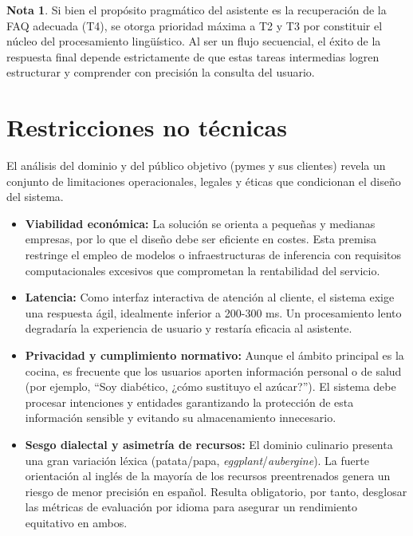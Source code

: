 \documentclass[11pt,a4paper,twoside]{article}
\theoremstyle{definition}
\newtheorem{nota}{Nota}
\numberwithin{equation}{section}
\begin{document}
\begin{nota}
	Si bien el propósito pragmático del asistente es la recuperación de la FAQ adecuada (T4), se otorga prioridad máxima a T2 y T3 por constituir el núcleo del procesamiento lingüístico. Al ser un flujo secuencial, el éxito de la respuesta final depende estrictamente de que estas tareas intermedias logren estructurar y comprender con precisión la consulta del usuario.
\end{nota}


\section{Restricciones no técnicas} \label{sec4}
El análisis del dominio y del público objetivo (pymes y sus clientes) revela un conjunto de limitaciones operacionales, legales y éticas que condicionan el diseño del sistema.
\begin{itemize}
	\item \textbf{Viabilidad económica:} La solución se orienta a pequeñas y medianas empresas, por lo que el diseño debe ser eficiente en costes. Esta premisa restringe el empleo de modelos o infraestructuras de inferencia con requisitos computacionales excesivos que comprometan la rentabilidad del servicio.
	\item \textbf{Latencia:} Como interfaz interactiva de atención al cliente, el sistema exige una respuesta ágil, idealmente inferior a 200-300 ms. Un procesamiento lento degradaría la experiencia de usuario y restaría eficacia al asistente.
	\item \textbf{Privacidad y cumplimiento normativo:} Aunque el ámbito principal es la cocina, es frecuente que los usuarios aporten información personal o de salud (por ejemplo, ``Soy diabético, ¿cómo sustituyo el azúcar?''). El sistema debe procesar intenciones y entidades garantizando la protección de esta información sensible y evitando su almacenamiento innecesario.
	\item \textbf{Sesgo dialectal y asimetría de recursos:} El dominio culinario presenta una gran variación léxica (patata/papa, \textit{eggplant}/\textit{aubergine}). La fuerte orientación al inglés de la mayoría de los recursos preentrenados genera un riesgo de menor precisión en español. Resulta obligatorio, por tanto, desglosar las métricas de evaluación por idioma para asegurar un rendimiento equitativo en ambos.
\end{itemize}
\end{document}
